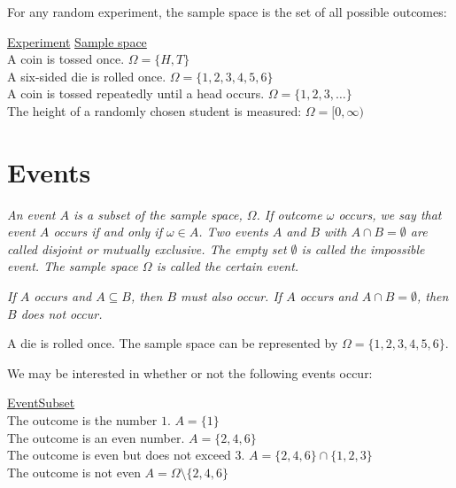 \break

\begin{example}
For any random experiment, the sample space is the set of all possible outcomes:
\begin{tabbing}
\underline{Experiment}\hspace{50ex} \= \underline{Sample space} \\[1ex]
A coin is tossed once.	\> $\Omega = \{H,T\}$ \\
A six-sided die is rolled once.	\> $\Omega=\{1,2,3,4,5,6\}$ \\
A coin is tossed repeatedly until a head occurs. \> $\Omega = \{1,2,3,\ldots\}$ \\
The height of a randomly chosen student is measured: \> $\Omega = [0,\infty)$
\end{tabbing}
\end{example}

\section{Events}

\begin{definition}
\bit
\it An \emph{event} $A$ is a subset of the sample space, $\Omega$. 
\it If outcome $\omega$ occurs, we say that event $A$ \emph{occurs} if and only if $\omega\in A$.
\it Two events $A$ and $B$ with $A\cap B=\emptyset$ are called \emph{disjoint} or \emph{mutually exclusive}.
\it The empty set $\emptyset$ is called the \emph{impossible event}.
\it The sample space $\Omega$ is called the \emph{certain event}.
\eit
\end{definition}

\begin{remark}
\bit
\it If $A$ occurs and $A\subseteq B$, then $B$ must also occur.
\it If $A$ occurs and $A\cap B=\emptyset$, then $B$ does not occur. 
\eit
\end{remark}

\break

\begin{example}
A die is rolled once. The sample space can be represented by $\Omega=\{1,2,3,4,5,6\}$.\par
We may be interested in whether or not the following events occur:
\begin{tabbing}
\underline{Event}\qquad\qquad\qquad\qquad\qquad\qquad\qquad\qquad\qquad\qquad\qquad\qquad\=\underline{Subset} \\ 
The outcome is the number $1$.	\> $A = \{1\}$ \\
The outcome is an even number.	\> $A = \{2,4,6\}$ \\
The outcome is even but does not exceed $3$.	\> $A = \{2,4,6\}\cap\{1,2,3\}$ \\
The outcome is not even			\> $A = \Omega\setminus\{2,4,6\}$
\end{tabbing}
\end{example}

